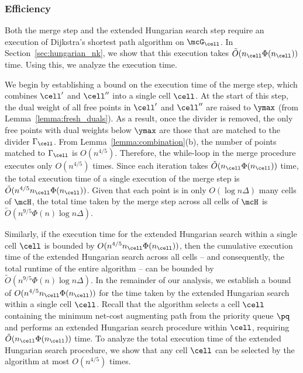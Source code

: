 \subsubsection{Efficiency}\label{subsec:efficiency}

Both the merge step and the extended Hungarian search step require an execution of Dijkstra's shortest path algorithm on $\mcG_\cell$. In Section~\ref{sec:hungarian_nk}, we show that this execution takes $\tilde{O}(n_\cell\Phi(n_\cell))$ time. Using this, we analyze the execution time.

We begin by establishing a bound on the execution time of the merge step, which combines $\cell'$ and $\cell''$ into a single cell $\cell$. At the start of this step, the dual weight of all free points in $\cell'$ and $\cell''$ are raised to $\ymax$ (from Lemma~\ref{lemma:fresh_duals}). As a result, once the divider is removed, the only free points with dual weights below $\ymax$ are those that are matched to the divider $\Gamma_\cell$.  From Lemma~\ref{lemma:combination}(b), the number of points matched to $\Gamma_\cell$ is $O(n^{4/5})$. Therefore, the while-loop in the merge procedure executes only $O(n^{4/5})$ times. Since each iteration takes $\tilde{O}(n_\cell\Phi(n_\cell))$ time, the total execution time of a single execution of the merge step is $\tilde{O}(n^{4/5}n_\cell \Phi(n_\cell))$. %
Given that each point is in only $O(\log n\Delta)$ many cells of $\mcH$, the total time taken by the merge step across all cells of $\mcH$ is $\tilde{O}(n^{9/5}\Phi(n)\log n\Delta)$.

Similarly, if the execution time for the extended Hungarian search within a single cell $\cell$ is bounded by $O(n^{4/5}n_\cell \Phi(n_\cell))$, then the cumulative execution time of the extended Hungarian search across all cells -- and consequently, the total runtime of the entire algorithm -- can be bounded by $\tilde{O}(n^{9/5}\Phi(n)\log n\Delta)$.
In the remainder of our analysis, we establish a bound of $O(n^{4/5}n_\cell \Phi(n_\cell))$ for the time taken by the extended Hungarian search within a single cell $\cell$.
Recall that the algorithm selects a cell $\cell$ containing the minimum net-cost augmenting path from the priority queue $\pq$ and performs an extended Hungarian search procedure within $\cell$, requiring $\tilde{O}(n_\cell\Phi(n_\cell))$ time. To analyze the total execution time of the extended Hungarian search procedure, we show that any cell $\cell$ can be selected by the algorithm at most $O(n^{4/5})$ times.

